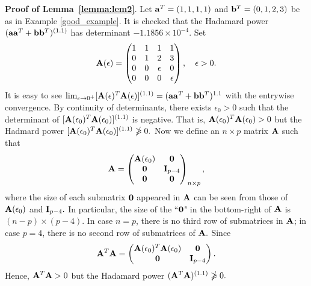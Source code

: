 \documentclass[conference,letterpaper]{IEEEtran}
\numberwithin{equation}{section}
\newcommand{\bd}{\bold}
\newcommand{\beaa}{\begin{eqnarray*}}
\newcommand{\eeaa}{\end{eqnarray*}}
\begin{document}
\noindent\textbf{Proof of Lemma~\ref{lemma:lem2}}. Let $\bd{a}^T=(1,1,1,1)$ and $\bd{b}^T=(0,1,2,3)$ be as in Example \ref{good_example}.
It is checked that the Hadamard power $(\bd{a}\bd{a}^T+\bd{b}\bd{b}^T)^{(1.1)}$ has determinant $-1.1856\times 10^{-4}.$
Set
\beaa
\bd{A}(\epsilon)=
\begin{pmatrix}
1 & 1& 1 & 1\\
0 & 1& 2 & 3\\
0 & 0 & \epsilon & 0\\
0 & 0& 0 & \epsilon
\end{pmatrix}
,\ \ \ \epsilon>0.
\eeaa
It is easy to see $\lim_{\epsilon \to 0^+}[\bd{A}(\epsilon)^T\bd{A}(\epsilon)]^{(1.1)}=(\bd{a}\bd{a}^T+\bd{b}\bd{b}^T)^{1.1}$ with the entrywise convergence. By continuity of determinants, there exists $\epsilon_0>0$ such that the determinant of $[\bd{A}(\epsilon_0)^T\bd{A}(\epsilon_0)]^{(1.1)}$ is negative. That is,  $\bd{A}(\epsilon_0)^T\bd{A}(\epsilon_0)>0$ but the Hadmard power $[\bd{A}(\epsilon_0)^T\bd{A}(\epsilon_0)]^{(1.1)} \ngeqslant 0.$ Now we define an $n\times p$ matrix $\bd{A}$ such that
\beaa
\bd{A}=
\begin{pmatrix}
  \bd{A}(\epsilon_0) & \bd{0}\\
\bd{0} & \bd{I}_{p-4}\\
\bd{0} & \bd{0}
\end{pmatrix}
_{n\times p},
\eeaa
where the size of each submatrix $\bd{0}$ appeared in $\bd{A}$ can be seen from those of $\bd{A}(\epsilon_0)$ and $\bd{I}_{p-4}.$ In particular, the size of the  ``$\bd{0}$" in the bottom-right of $\bd{A}$ is $(n-p)\times (p-4).$ In case $n=p$, there is no  third row of submatrices in $\bd{A}$; in case $p=4$, there is no  second row of submatrices of $\bd{A}.$ Since
\beaa
\bd{A}^T\bd{A}
=
\begin{pmatrix}
\bd{A}(\epsilon_0)^T\bd{A}(\epsilon_0) & \bd{0}\\
\bd{0} & \bd{I}_{p-4}
\end{pmatrix}
.
\eeaa
Hence, $\bd{A}^T\bd{A}>0$ but the Hadamard power $(\bd{A}^T\bd{A})^{(1.1)} \ngeqslant 0.$
\end{document}
